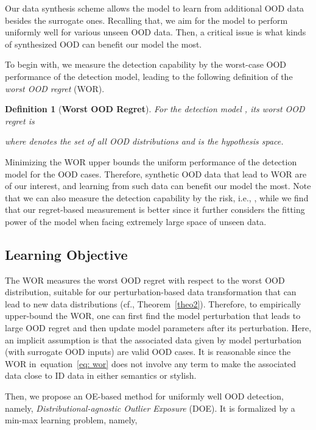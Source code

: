\documentclass{article} \usepackage{iclr2022_conference,times}
\def\eqref#1{equation~\ref{#1}}
\newtheorem{definition}{Definition}
\begin{document}
Our data synthesis scheme allows the model  to learn from additional OOD data besides the surrogate ones. Recalling that, we aim for the model to perform uniformly well for various unseen OOD data. Then, a critical issue is what kinds of synthesized OOD can benefit our model the most.

To begin with, we measure the detection capability by the worst-case OOD performance of the detection model, leading to the following definition of the \emph{worst OOD regret} (WOR). 
\begin{definition}[\textbf{Worst OOD Regret}] \label{def: wor}
For the detection model , its worst OOD regret is

where  denotes the set of all OOD distributions and  is the hypothesis space. 
\end{definition}
Minimizing the WOR upper bounds the uniform performance of the detection model for the OOD cases. Therefore, synthetic OOD data that lead to WOR are of our interest, and learning from such data can benefit our model the most. Note that we can also measure the detection capability by the risk, i.e., , while we find that our regret-based measurement is better since it further considers the fitting power of the model when facing extremely large space of unseen data. 



\subsection{Learning Objective}

The WOR measures the worst OOD regret with respect to the worst OOD distribution, suitable for our perturbation-based data transformation that can lead to new data distributions (cf., Theorem~\ref{theo2}). Therefore, to empirically upper-bound the WOR, one can first find the model perturbation that leads to large OOD regret and then update model parameters after its perturbation. Here, an implicit assumption is that the associated data given by model perturbation (with surrogate OOD inputs) are valid OOD cases. It is reasonable since the WOR in~\eqref{eq: wor} does not involve any term to make the associated data close to ID data in either semantics or stylish. 



Then, we propose an OE-based method for uniformly well OOD detection, namely, \emph{Distributional-agnostic Outlier Exposure} (DOE). It is formalized by a min-max learning problem, namely,
\end{document}
